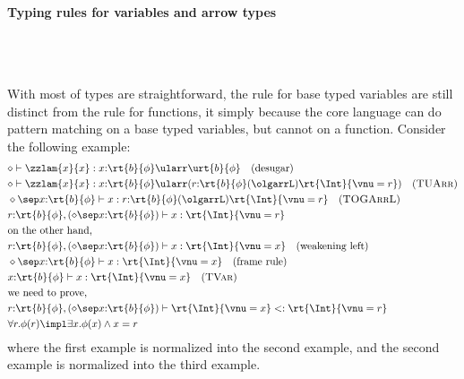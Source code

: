 \paragraph{Typing rules for variables and arrow types}

\begin{figure}[!ht]
    \quad
    \\[.8em]
    \quad
    \\[.8em]
    \quad
\end{figure}

With most of types are straightforward, the rule for base typed variables are still distinct from the rule for functions, it simply because the core language can do pattern matching on a base typed variables, but cannot on a function. Consider the following example:
\begin{align*}
    &\diamond \vdash \zzlam{x}{x} : x{:}\rt{b}{\phi} \ularr \urt{b}{\phi} \quad (\text{desugar}) \\
    &\diamond \vdash \zzlam{x}{x} : x{:}\rt{b}{\phi} \ularr (r{:}\rt{b}{\phi} (\olgarrL) \rt{\Int}{\vnu = r}) \quad (\textsc{TUArr}) \\
    &\diamond \sep x{:}\rt{b}{\phi} \vdash x : r{:}\rt{b}{\phi} (\olgarrL) \rt{\Int}{\vnu = r} \quad (\textsc{TOGArrL}) \\
    &r{:}\rt{b}{\phi}, (\diamond \sep x{:}\rt{b}{\phi}) \vdash x : \rt{\Int}{\vnu = r} \\
    &\text{on the other hand,} \\
    &r{:}\rt{b}{\phi}, (\diamond \sep x{:}\rt{b}{\phi}) \vdash x : \rt{\Int}{\vnu = x} \quad (\text{weakening left}) \\
    &\diamond \sep x{:}\rt{b}{\phi} \vdash x : \rt{\Int}{\vnu = x} \quad (\text{frame rule}) \\
    &x{:}\rt{b}{\phi} \vdash x : \rt{\Int}{\vnu = x} \quad (\textsc{TVar}) \\
    &\text{we need to prove,} \\
    &r{:}\rt{b}{\phi}, (\diamond \sep x{:}\rt{b}{\phi}) \vdash \rt{\Int}{\vnu = x} <: \rt{\Int}{\vnu = r} \\
    &\forall r. \phi(r) \impl \exists x. \phi(x) \land x = r
\end{align*}\noindent
where the first example is normalized into the second example, and the second example is normalized into the third example.

